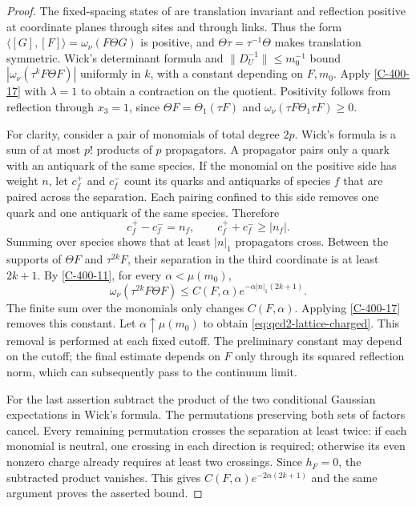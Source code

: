 \documentclass[11pt,letterpaper,reqno]{amsart}
\theoremstyle{definition}
\theoremstyle{remark}
\begin{document}
\begin{proof}
The fixed-spacing states of \cite{QCDM1} are translation
invariant and reflection positive at coordinate planes
through sites and through links. Thus the form
$\langle[G],[F]\rangle=\omega_\nu(F\Theta G)$ is
positive, and $\Theta\tau=\tau^{-1}\Theta$ makes
translation symmetric. Wick's determinant formula
and $\|D_U^{-1}\|\le m_0^{-1}$ bound
$|\omega_\nu(\tau^kF\Theta F)|$ uniformly in $k$,
with a constant depending on $F,m_0$. Apply
\cref{C-400-17} with $\lambda=1$ to obtain a
contraction on the quotient. Positivity follows
from reflection through $x_3=1$, since
$\Theta F=\Theta_1(\tau F)$ and
$\omega_\nu(\tau F\Theta_1\tau F)\ge0$.

For clarity, consider a pair of monomials of total
degree $2p$. Wick's formula is a sum of at most $p!$
products of $p$ propagators. A propagator pairs only
a quark with an antiquark of the same species.
If the monomial on the positive side has weight $n$,
let $c_f^+$ and $c_f^-$ count its quarks and antiquarks
of species $f$ that are paired across the separation.
Each pairing confined to this side removes one quark
and one antiquark of the same species. Therefore
\[
 c_f^+-c_f^-=n_f,\qquad c_f^++c_f^-\ge|n_f|.
\]
Summing over species shows that at least $|n|_1$
propagators cross. Between the supports of
$\Theta F$ and $\tau^{2k}F$, their separation in
the third coordinate is at least $2k+1$.
By \cref{C-400-11}, for every $\alpha<\mu(m_0)$,
\[
 \omega_\nu(\tau^{2k}F\Theta F)
       \le C(F,\alpha)e^{-\alpha|n|_1(2k+1)}.
\]
The finite sum over the monomials only changes
$C(F,\alpha)$. Applying \cref{C-400-17} removes
this constant. Let $\alpha\uparrow\mu(m_0)$ to
obtain \eqref{eq:qcd2-lattice-charged}. This removal is
performed at each fixed cutoff. The preliminary constant
may depend on the cutoff; the final estimate depends
on $F$ only through its squared reflection norm, which
can subsequently pass to the continuum limit.

For the last assertion subtract the product of the
two conditional Gaussian expectations in Wick's
formula. The permutations preserving both sets
of factors cancel. Every remaining permutation
crosses the separation at least twice: if each
monomial is neutral, one crossing in each direction
is required; otherwise its even nonzero charge
already requires at least two crossings. Since
$h_F=0$, the subtracted product vanishes. This gives
$C(F,\alpha)e^{-2\alpha(2k+1)}$ and the same
argument proves the asserted bound.
\end{proof}
\end{document}
